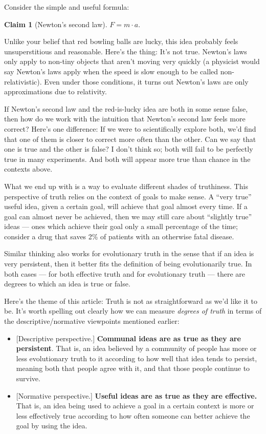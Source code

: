 \documentclass[11pt, oneside]{article}
\newtheorem*{claim}{Claim}
\theoremstyle{argtstyle}
\begin{document}
Consider the simple and useful formula:
\begin{claim}[Newton's second law]
    $F = m \cdot a.$
\end{claim}

Unlike your belief that red bowling balls are lucky, this idea probably feels
unsuperstitious and reasonable. Here's the thing: It's not true.
Newton's laws only apply to non-tiny
objects that aren't moving very quickly (a physicist would say Newton's laws
apply when the speed is slow enough to be called non-relativistic).
Even under those conditions,
it turns out Newton's laws are only approximations due
to relativity.

If Newton's second law and the
red-is-lucky idea are both in some sense false, then
how do we work with the intuition that
Newton's second law feels more correct?
Here's one difference: If we were to scientifically
explore both, we'd find that one of them is closer to
correct more often than the other.
Can we say that one is true and the other is false? I don't think so;
both will fail to be perfectly true in many experiments. And both will appear
more true than chance in the contexts above.

What we end up with is a way to evaluate different shades of truthiness.
This perspective of truth relies on the context of goals to make sense.
A ``very true'' useful idea, given
a certain goal, will achieve that goal almost every time. If a goal can
almost never be achieved, then we may still care about ``slightly true'' ideas
--- ones which achieve their goal only a small percentage of the time;
consider a drug that saves 2\% of patients with an otherwise fatal disease.

Similar thinking also works for evolutionary truth in the sense that if an idea
is very persistent, then it better fits the definition of being evolutionarily
true. In both cases --- for both effective truth and for evolutionary truth ---
there are degrees to which an idea is true or false.

Here's the theme of this article:
Truth is not as straightforward as we'd like it to be.
It's worth spelling out clearly how we can
measure {\em degrees of truth} in terms of
the descriptive/normative viewpoints mentioned earlier:
\begin{itemize}
    \item{} [Descriptive perspective.]
        {\bf Communal ideas are as true as they are
        persistent}.
        That is, an idea believed by a community of people has
        more or less evolutionary truth to it according to how well that
        idea tends to persist, meaning both that people agree with it, and
        that those people continue to survive.
    \item{} [Normative perspective.]
        {\bf Useful ideas are as true as they are effective.}
        That is, an idea being used to achieve a goal in a certain context
        is more or less effectively true according to how often someone can
        better achieve the goal by using the idea.
\end{itemize}
\end{document}
